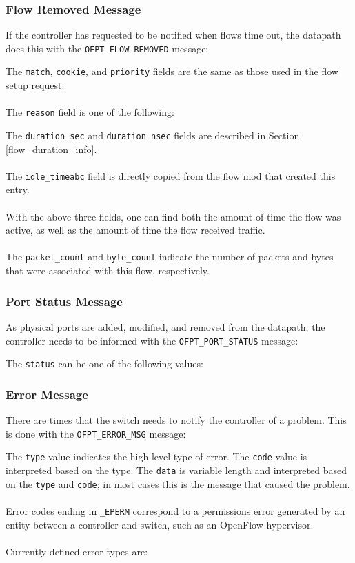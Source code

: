 
 
\subsubsection{Flow Removed Message}
If the controller has requested to be notified when flows time out, the datapath does this with the \verb|OFPT_FLOW_REMOVED| message:


The \verb|match|, \verb|cookie|, and \verb|priority| fields are the same as those used in the flow setup request.
\\\\
The \verb|reason| field is one of the following:


The \verb|duration_sec| and \verb|duration_nsec| fields are described in Section \ref{flow_duration_info}.
\\\\
The \verb|idle_timeabc| field is directly copied from the flow mod that created this entry. 
\\\\
With the above three fields, one can find both the amount of time the flow was active, as well as the amount of time the flow received traffic.
\\\\
The \verb|packet_count| and \verb|byte_count| indicate the number of packets and bytes that were associated with this flow, respectively. 
 
\subsubsection{Port Status Message}
As physical ports are added, modified, and removed from the datapath, the controller needs to be informed with the \verb|OFPT_PORT_STATUS| message:


The \verb|status| can be one of the following values:

 

\subsubsection{Error Message}
There are times that the switch needs to notify the controller of a problem.  This is done with the \verb|OFPT_ERROR_MSG| message: 	


The \verb|type| value indicates the high-level type of error.  The \verb|code| value is interpreted based on the type.  The \verb|data| is variable length and interpreted based on the \verb|type| and \verb|code|; in most cases this is the message that caused the problem.  
\\\\
Error codes ending in \verb|_EPERM| correspond to a permissions error generated by an entity between a controller and switch, such as an OpenFlow hypervisor. 
\\\\
Currently defined error types are:

